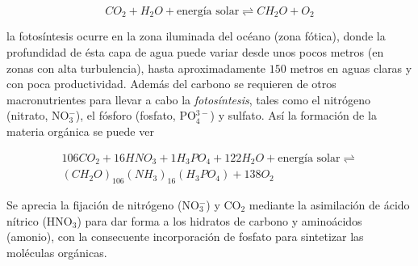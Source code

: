 \begin{equation} \label{eq:marco1.2}
CO_{2} + H_{2}O + \textrm{energía solar} \rightleftharpoons CH_{2}O + O_{2}
\end{equation}

la fotosíntesis ocurre en la zona iluminada del océano (zona fótica), donde la profundidad de ésta capa de agua puede variar desde unos pocos metros (en zonas con alta turbulencia), hasta aproximadamente $150$ metros en aguas claras y con poca productividad. Además del carbono se requieren de otros macronutrientes para llevar a cabo la \textit{fotosíntesis}, tales como el nitrógeno (nitrato, NO$^{-}_{3}$), el fósforo (fosfato, PO$^{3-}_{4}$) y sulfato. Así la formación de la materia orgánica se puede ver

\begin{equation} \label{eq:marco1.3}
\begin{split}
106CO_{2} + 16HNO_{3} + 1H_{3}PO_{4} +122H_{2}O+ \textrm{energía solar} \rightleftharpoons \\
(CH_{2}O)_{106}(NH_{3})_{16}(H_{3}PO_{4})  + 138O_{2}
\end{split}
\end{equation}

Se aprecia la fijación de nitrógeno (NO$^{-}_{3}$) y CO$_2$ mediante la asimilación de ácido nítrico (HNO$_{3}$) para dar forma a los hidratos de carbono y aminoácidos (amonio), con la consecuente incorporación de fosfato para sintetizar las moléculas orgánicas. \\

